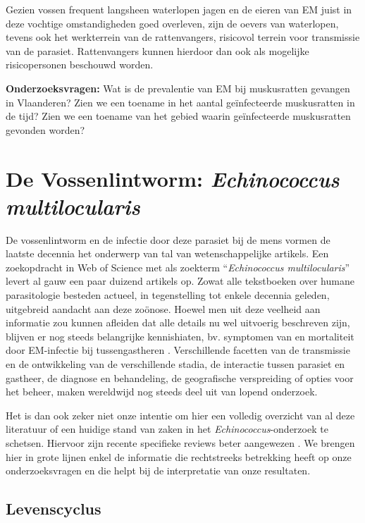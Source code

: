 \documentclass[twoside]{extreport}
\begin{document}
Gezien vossen frequent langsheen waterlopen jagen en de eieren van EM
juist in deze vochtige omstandigheden goed overleven, zijn de oevers van
waterlopen, tevens ook het werkterrein van de rattenvangers, risicovol
terrein voor transmissie van de parasiet. Rattenvangers kunnen hierdoor
dan ook als mogelijke risicopersonen beschouwd worden.

\textbf{Onderzoeksvragen:} Wat is de prevalentie van EM bij muskusratten
gevangen in Vlaanderen? Zien we een toename in het aantal geïnfecteerde
muskusratten in de tijd? Zien we een toename van het gebied waarin
geïnfecteerde muskusratten gevonden worden?

\chapter{\texorpdfstring{De Vossenlintworm: \emph{Echinococcus
multilocularis}}{De Vossenlintworm:   Echinococcus multilocularis}}\label{de-vossenlintworm-echinococcus-multilocularis}

De vossenlintworm en de infectie door deze parasiet bij de mens vormen
de laatste decennia het onderwerp van tal van wetenschappelijke
artikels. Een zoekopdracht in Web of Science met als zoekterm
``\emph{Echinococcus multilocularis}'' levert al gauw een paar duizend
artikels op. Zowat alle tekstboeken over humane parasitologie besteden
actueel, in tegenstelling tot enkele decennia geleden, uitgebreid
aandacht aan deze zoönose. Hoewel men uit deze veelheid aan informatie
zou kunnen afleiden dat alle details nu wel uitvoerig beschreven zijn,
blijven er nog steeds belangrijke kennishiaten, bv. symptomen van en
mortaliteit door EM-infectie bij tussengastheren
\citep{romig2017ecology}. Verschillende facetten van de transmissie en
de ontwikkeling van de verschillende stadia, de interactie tussen
parasiet en gastheer, de diagnose en behandeling, de geografische
verspreiding of opties voor het beheer, maken wereldwijd nog steeds deel
uit van lopend onderzoek.

Het is dan ook zeker niet onze intentie om hier een volledig overzicht
van al deze literatuur of een huidige stand van zaken in het
\emph{Echinococcus}-onderzoek te schetsen. Hiervoor zijn recente
specifieke reviews beter aangewezen
\citep{deplazes2017global, oksanen2016geographical}. We brengen hier in
grote lijnen enkel de informatie die rechtstreeks betrekking heeft op
onze onderzoeksvragen en die helpt bij de interpretatie van onze
resultaten.

\section{Levenscyclus}\label{levenscyclus}
\end{document}
